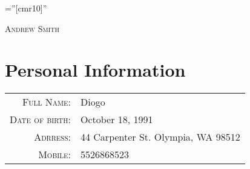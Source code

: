 \documentclass [a4paper,10pt]{article}
\begin{document}
\pagestyle{empty} %

\font\fb=''[cmr10]'' %

\par{\centering
		{\Huge   \textsc{Andrew Smith}
	}\bigskip\par}


\section{Personal Information}

\begin{tabular}{rl}
    \textsc{Full Name:} & Diogo \\
    \textsc{Date of birth:} & October 18, 1991 \\
    \textsc{Adrress:}   & 44 Carpenter St.
    Olympia, WA 98512\\
    \textsc{Mobile:}     & 5526868523\\
    
\end{tabular}
\end{document}
